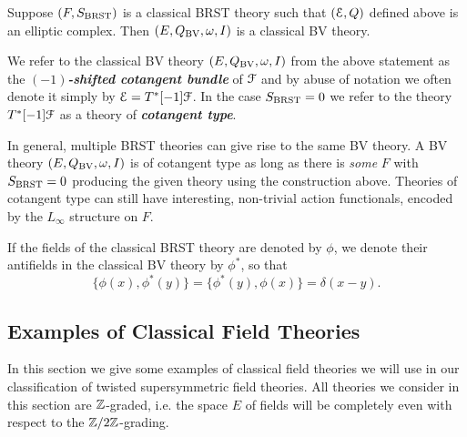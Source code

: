 \documentclass[10pt, oneside]{article}
\newcommand{\defterm}[1]{\textbf{\emph{#1}}}
\begin{document}
\begin{lemma}
Suppose $(F, S_{\mathrm{BRST}})$ is a classical BRST theory such that $(\mathcal E, Q)$ defined above is an elliptic complex. Then $(E, Q_{\mathrm{BV}}, \omega, I)$ is a classical BV theory.
\end{lemma}

We refer to the classical BV theory $(E, Q_{\mathrm{BV}}, \omega, I)$ from the above statement as the \defterm{$(-1)$-shifted cotangent bundle} of $\mathcal F$ and by abuse of notation we often denote it simply by $\mathcal E = T^*[-1] \mathcal F$. In the case $S_{\mathrm{BRST}} = 0$ we refer to the theory $T^*[-1] \mathcal F$ as a theory of \defterm{cotangent type}.

\begin{remark}
In general, multiple BRST theories can give rise to the same BV theory.  A BV theory $(E, Q_{\mathrm{BV}}, \omega, I)$ is of cotangent type as long as there is \emph{some} $F$ with $S_{\mathrm{BRST}} = 0$ producing the given theory using the construction above.  Theories of cotangent type can still have interesting, non-trivial action functionals, encoded by the $L_\infty$ structure on $F$.
\end{remark}

If the fields of the classical BRST theory are denoted by $\phi$, we denote their antifields in the classical BV theory by $\phi^*$, so that
\[\{\phi(x), \phi^*(y)\} = \{\phi^*(y), \phi(x)\} = \delta(x-y).\]
 

\subsection{Examples of Classical Field Theories}

In this section we give some examples of classical field theories we will use in our classification of twisted supersymmetric field theories. All theories we consider in this section are $\mathbb Z$-graded, i.e. the space $E$ of fields will be completely even with respect to the $\mathbb Z/2\mathbb Z$-grading.
\end{document}
